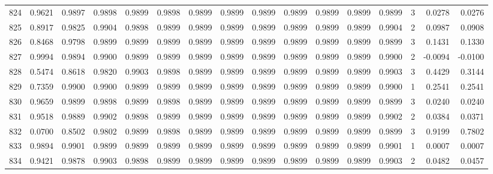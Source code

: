 \begin{tabular}{lrrrrrrrrrrrrrrr}
824 &      0.9621 &  0.9897 &  0.9898 &  0.9899 &  0.9898 &  0.9899 &  0.9899 &  0.9899 &  0.9899 &  0.9899 &   0.9899 &     0.9899 &      3 &                    0.0278 &                     0.0276 \\
825 &      0.8917 &  0.9825 &  0.9904 &  0.9898 &  0.9899 &  0.9899 &  0.9899 &  0.9899 &  0.9899 &  0.9899 &   0.9899 &     0.9904 &      2 &                    0.0987 &                     0.0908 \\
826 &      0.8468 &  0.9798 &  0.9899 &  0.9899 &  0.9899 &  0.9899 &  0.9899 &  0.9899 &  0.9899 &  0.9899 &   0.9899 &     0.9899 &      3 &                    0.1431 &                     0.1330 \\
827 &      0.9994 &  0.9894 &  0.9900 &  0.9899 &  0.9899 &  0.9899 &  0.9899 &  0.9899 &  0.9899 &  0.9899 &   0.9899 &     0.9900 &      2 &                   -0.0094 &                    -0.0100 \\
828 &      0.5474 &  0.8618 &  0.9820 &  0.9903 &  0.9898 &  0.9899 &  0.9899 &  0.9899 &  0.9899 &  0.9899 &   0.9899 &     0.9903 &      3 &                    0.4429 &                     0.3144 \\
829 &      0.7359 &  0.9900 &  0.9900 &  0.9899 &  0.9899 &  0.9899 &  0.9899 &  0.9899 &  0.9899 &  0.9899 &   0.9899 &     0.9900 &      1 &                    0.2541 &                     0.2541 \\
830 &      0.9659 &  0.9899 &  0.9898 &  0.9899 &  0.9898 &  0.9899 &  0.9899 &  0.9899 &  0.9899 &  0.9899 &   0.9899 &     0.9899 &      3 &                    0.0240 &                     0.0240 \\
831 &      0.9518 &  0.9889 &  0.9902 &  0.9898 &  0.9899 &  0.9899 &  0.9899 &  0.9899 &  0.9899 &  0.9899 &   0.9899 &     0.9902 &      2 &                    0.0384 &                     0.0371 \\
832 &      0.0700 &  0.8502 &  0.9802 &  0.9899 &  0.9898 &  0.9899 &  0.9899 &  0.9899 &  0.9899 &  0.9899 &   0.9899 &     0.9899 &      3 &                    0.9199 &                     0.7802 \\
833 &      0.9894 &  0.9901 &  0.9899 &  0.9899 &  0.9899 &  0.9899 &  0.9899 &  0.9899 &  0.9899 &  0.9899 &   0.9899 &     0.9901 &      1 &                    0.0007 &                     0.0007 \\
834 &      0.9421 &  0.9878 &  0.9903 &  0.9898 &  0.9899 &  0.9899 &  0.9899 &  0.9899 &  0.9899 &  0.9899 &   0.9899 &     0.9903 &      2 &                    0.0482 &                     0.0457 \\

\end{tabular}
